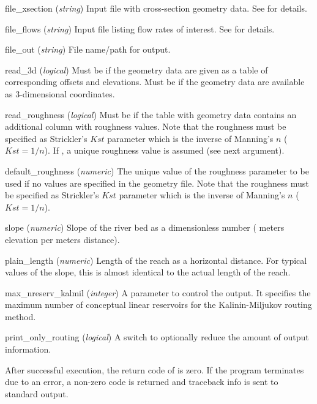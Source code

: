\begin{columndef}
  \item[file\_xsection] (\textit{string}) Input file with cross-section geometry data. See  for details.
  \item[file\_flows] (\textit{string}) Input file listing flow rates of interest. See  for details.
  \item[file\_out] (\textit{string}) File name/path for output.
  \item[read\_3d] (\textit{logical}) Must be \false{} if the geometry data are given as a table of corresponding offsets and elevations. Must be \true{} if the geometry data are available as 3-dimensional coordinates.
  \item[read\_roughness] (\textit{logical}) Must be \true{} if the table with geometry data contains an additional column with roughness values. Note that the roughness must be specified as Strickler's $Kst$ parameter which is the inverse of Manning's $n$ ($Kst = 1/n$). If \false{}, a unique roughness value is assumed (see next argument).
  \item[default\_roughness] (\textit{numeric}) The unique value of the roughness parameter to be used if no values are specified in the geometry file. Note that the roughness must be specified as Strickler's $Kst$ parameter which is the inverse of Manning's $n$ ($Kst = 1/n$).
  \item[slope] (\textit{numeric}) Slope of the river bed as a dimensionless number (\ie{} meters elevation per meters distance).
  \item[plain\_length] (\textit{numeric}) Length of the reach as a horizontal distance. For typical values of the slope, this is almost identical to the actual length of the reach. 
  \item[max\_nreserv\_kalmil] (\textit{integer}) A parameter to control the output. It specifies the maximum number of conceptual linear reservoirs for the Kalinin-Miljukov routing method.
  \item[print\_only\_routing] (\textit{logical}) A switch to optionally reduce the amount of output information.
\end{columndef}

After successful execution, the return code of  is zero. If the program terminates due to an error, a non-zero code is returned and traceback info is sent to standard output.


